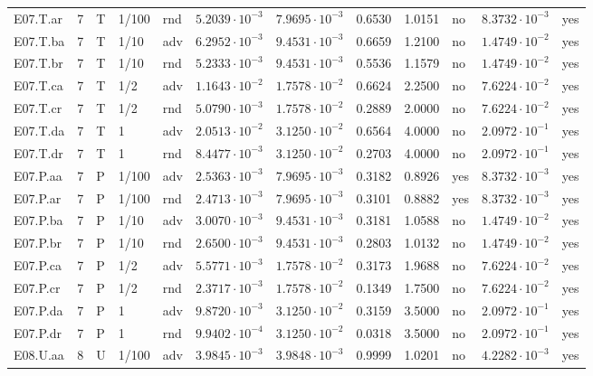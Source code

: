 {\begin{longtable}{@{}lllllllllll l@{}}
E07.T.ar & 7 & T & 1/100 & rnd & $5.2039\cdot 10^{-3}$ & $7.9695\cdot 10^{-3}$ & 0.6530 & 1.0151 & no & $8.3732\cdot 10^{-3}$ & yes \\
E07.T.ba & 7 & T & 1/10 & adv & $6.2952\cdot 10^{-3}$ & $9.4531\cdot 10^{-3}$ & 0.6659 & 1.2100 & no & $1.4749\cdot 10^{-2}$ & yes \\
E07.T.br & 7 & T & 1/10 & rnd & $5.2333\cdot 10^{-3}$ & $9.4531\cdot 10^{-3}$ & 0.5536 & 1.1579 & no & $1.4749\cdot 10^{-2}$ & yes \\
E07.T.ca & 7 & T & 1/2 & adv & $1.1643\cdot 10^{-2}$ & $1.7578\cdot 10^{-2}$ & 0.6624 & 2.2500 & no & $7.6224\cdot 10^{-2}$ & yes \\
E07.T.cr & 7 & T & 1/2 & rnd & $5.0790\cdot 10^{-3}$ & $1.7578\cdot 10^{-2}$ & 0.2889 & 2.0000 & no & $7.6224\cdot 10^{-2}$ & yes \\
E07.T.da & 7 & T & 1 & adv & $2.0513\cdot 10^{-2}$ & $3.1250\cdot 10^{-2}$ & 0.6564 & 4.0000 & no & $2.0972\cdot 10^{-1}$ & yes \\
E07.T.dr & 7 & T & 1 & rnd & $8.4477\cdot 10^{-3}$ & $3.1250\cdot 10^{-2}$ & 0.2703 & 4.0000 & no & $2.0972\cdot 10^{-1}$ & yes \\
E07.P.aa & 7 & P & 1/100 & adv & $2.5363\cdot 10^{-3}$ & $7.9695\cdot 10^{-3}$ & 0.3182 & 0.8926 & yes & $8.3732\cdot 10^{-3}$ & yes \\
E07.P.ar & 7 & P & 1/100 & rnd & $2.4713\cdot 10^{-3}$ & $7.9695\cdot 10^{-3}$ & 0.3101 & 0.8882 & yes & $8.3732\cdot 10^{-3}$ & yes \\
E07.P.ba & 7 & P & 1/10 & adv & $3.0070\cdot 10^{-3}$ & $9.4531\cdot 10^{-3}$ & 0.3181 & 1.0588 & no & $1.4749\cdot 10^{-2}$ & yes \\
E07.P.br & 7 & P & 1/10 & rnd & $2.6500\cdot 10^{-3}$ & $9.4531\cdot 10^{-3}$ & 0.2803 & 1.0132 & no & $1.4749\cdot 10^{-2}$ & yes \\
E07.P.ca & 7 & P & 1/2 & adv & $5.5771\cdot 10^{-3}$ & $1.7578\cdot 10^{-2}$ & 0.3173 & 1.9688 & no & $7.6224\cdot 10^{-2}$ & yes \\
E07.P.cr & 7 & P & 1/2 & rnd & $2.3717\cdot 10^{-3}$ & $1.7578\cdot 10^{-2}$ & 0.1349 & 1.7500 & no & $7.6224\cdot 10^{-2}$ & yes \\
E07.P.da & 7 & P & 1 & adv & $9.8720\cdot 10^{-3}$ & $3.1250\cdot 10^{-2}$ & 0.3159 & 3.5000 & no & $2.0972\cdot 10^{-1}$ & yes \\
E07.P.dr & 7 & P & 1 & rnd & $9.9402\cdot 10^{-4}$ & $3.1250\cdot 10^{-2}$ & 0.0318 & 3.5000 & no & $2.0972\cdot 10^{-1}$ & yes \\
E08.U.aa & 8 & U & 1/100 & adv & $3.9845\cdot 10^{-3}$ & $3.9848\cdot 10^{-3}$ & 0.9999 & 1.0201 & no & $4.2282\cdot 10^{-3}$ & yes \\

\end{longtable}}
